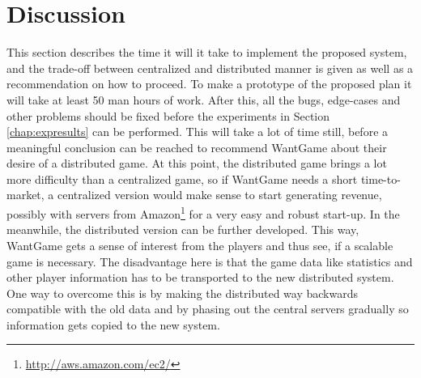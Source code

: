 \section{Discussion}
\label{chap:discussion}
This section describes the time it will it take to implement the proposed system,  and the trade-off between centralized and distributed manner is given as well as a recommendation on how to proceed.
To make a prototype of the proposed plan it will take at least 50 man hours of work. After this, all the bugs, edge-cases and other problems should be fixed before the experiments in Section \ref{chap:expresults} can be performed. This will take a lot of time still, before a meaningful conclusion can be reached to recommend WantGame about their desire of a distributed game. 
At this point, the distributed game brings a lot more difficulty than a centralized game, so if WantGame needs a short time-to-market, a centralized version would make sense to start generating revenue, possibly with servers from Amazon\footnote{\url{http://aws.amazon.com/ec2/}} for a very easy and robust start-up. In the meanwhile, the distributed version can be further developed. This way, WantGame gets a sense of interest from the players and thus see, if a scalable game is necessary. The disadvantage here is that the game data like statistics and other player information has to be transported to the new distributed system. One way to overcome this is by making the distributed way backwards compatible with the old data and by phasing out the central servers gradually so information gets copied to the new system.
